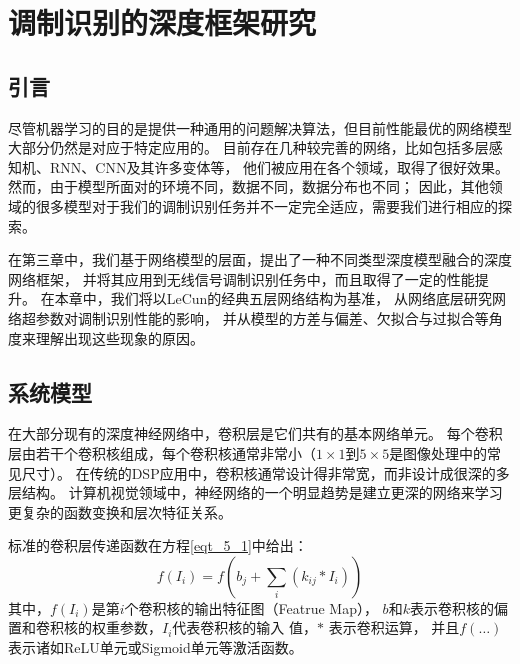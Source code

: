 \chapter{调制识别的深度框架研究}

\section{引言}

尽管机器学习的目的是提供一种通用的问题解决算法，但目前性能最优的网络模型大部分仍然是对应于特定应用的。
目前存在几种较完善的网络，比如包括多层感知机、RNN、CNN及其许多变体等，
他们被应用在各个领域，取得了很好效果\cite{lecun2015deep}\cite{schmidhuber2015deep}。
然而，由于模型所面对的环境不同，数据不同，数据分布也不同；
因此，其他领域的很多模型对于我们的调制识别任务并不一定完全适应，需要我们进行相应的探索。 \par

在第三章中，我们基于网络模型的层面，提出了一种不同类型深度模型融合的深度网络框架，
并将其应用到无线信号调制识别任务中，而且取得了一定的性能提升。
在本章中，我们将以LeCun的经典五层网络结构\cite{lecun1998gradient}为基准，
从网络底层研究网络超参数对调制识别性能的影响，
并从模型的方差与偏差\cite{周志华2016机器学习}、欠拟合与过拟合\cite{goodfellow2016deep}等角度来理解出现这些现象的原因。\par

\section{系统模型}

在大部分现有的深度神经网络中，卷积层是它们共有的基本网络单元。
每个卷积层由若干个卷积核组成，每个卷积核通常非常小（$1 \times 1$到$5 \times 5$是图像处理中的常见尺寸）。
在传统的DSP应用中，卷积核通常设计得非常宽，而非设计成很深的多层结构。
计算机视觉领域中，神经网络的一个明显趋势是建立更深的网络来学习更复杂的函数变换和层次特征关系。\par

标准的卷积层传递函数在方程\eqref{eqt_5_1}中给出：
\begin{equation}
	\label{eqt_5_1}
	f(I_i) = f (b_j + \sum_{i}(k_{ij} * I_i))
\end{equation}
其中，$f(I_i)$是第$i$个卷积核的输出特征图（Featrue Map），
$b$和$k$表示卷积核的偏置和卷积核的权重参数，$I_i$代表卷积核的输入 值，$*$ 表示卷积运算，
并且$f(\dots)$表示诸如ReLU单元或Sigmoid单元等激活函数。\par

